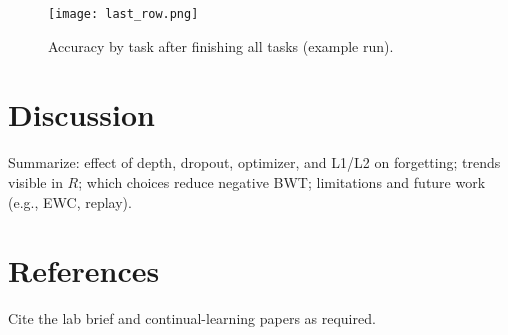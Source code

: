 \documentclass{article} %
\begin{document}
\begin{figure}[h]
\centering
\texttt{[image: last\_row.png]}
\caption{Accuracy by task after finishing all tasks (example run).}
\end{figure}

\section{Discussion}
Summarize: effect of depth, dropout, optimizer, and L1/L2 on forgetting; trends visible in $R$; which choices reduce negative BWT; limitations and future work (e.g., EWC, replay).

\section{References}
Cite the lab brief and continual-learning papers as required.
\end{document}
